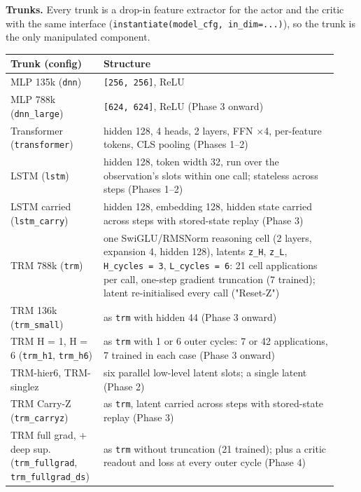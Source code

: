 \documentclass[11pt]{article}
\begin{document}
\textbf{Trunks.} Every trunk is a drop-in feature extractor for the actor and the critic with the same interface (\texttt{instantiate(model\_\allowbreak{}cfg,\allowbreak{} in\_\allowbreak{}dim=.\allowbreak{}.\allowbreak{}.\allowbreak{})}), so the trunk is the only manipulated component.



\begin{center}\small\begin{tabular}{>{\raggedright\arraybackslash}p{0.248\linewidth}>{\raggedright\arraybackslash}p{0.686\linewidth}}
\toprule
Trunk (config) & Structure \\
\midrule
MLP 135k (\texttt{dnn}) & \texttt{[256, 256]}, ReLU \\
MLP 788k (\texttt{dnn\_large}) & \texttt{[624, 624]}, ReLU (Phase 3 onward) \\
Transformer (\texttt{transformer}) & hidden 128, 4 heads, 2 layers, FFN $\times$4, per-feature tokens, CLS pooling (Phases 1--2) \\
LSTM (\texttt{lstm}) & hidden 128, token width 32, run over the observation's slots within one call; stateless across steps (Phases 1--2) \\
LSTM carried (\texttt{lstm\_carry}) & hidden 128, embedding 128, hidden state carried across steps with stored-state replay (Phase 3) \\
TRM 788k (\texttt{trm}) & one SwiGLU/RMSNorm reasoning cell (2 layers, expansion 4, hidden 128), latents \texttt{z\_H}, \texttt{z\_L}, \texttt{H\_cycles = 3}, \texttt{L\_cycles = 6}: 21 cell applications per call, one-step gradient truncation (7 trained); latent re-initialised every call ("Reset-Z") \\
TRM 136k (\texttt{trm\_small}) & as \texttt{trm} with hidden 44 (Phase 3 onward) \\
TRM H = 1, H = 6 (\texttt{trm\_h1}, \texttt{trm\_h6}) & as \texttt{trm} with 1 or 6 outer cycles: 7 or 42 applications, 7 trained in each case (Phase 3 onward) \\
TRM-hier6, TRM-singlez & six parallel low-level latent slots; a single latent (Phase 2) \\
TRM Carry-Z (\texttt{trm\_carryz}) & as \texttt{trm}, latent carried across steps with stored-state replay (Phase 3) \\
TRM full grad, + deep sup. (\texttt{trm\_fullgrad}, \texttt{trm\_\allowbreak{}fullgrad\_\allowbreak{}ds}) & as \texttt{trm} without truncation (21 trained); plus a critic readout and loss at every outer cycle (Phase 4) \\
\bottomrule
\end{tabular}\end{center}
\end{document}
